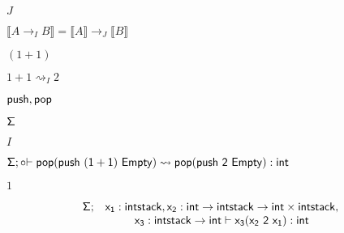 \documentclass[10pt]{book}
\begin{document}
\begin{mdSnippets}
\begin{mdInlineSnippet}%
$J$\end{mdInlineSnippet}%
\begin{mdInlineSnippet}[3770b5b04be251b0fdf3f4fc0a74d5fe]%
$\llbracket A\rightarrow_I B\rrbracket =\llbracket A \rrbracket \rightarrow_J \llbracket B \rrbracket $\end{mdInlineSnippet}%
\begin{mdInlineSnippet}[084d81b8c5dc70186c48137b0f155453]%
$(1+1)$\end{mdInlineSnippet}%
\begin{mdInlineSnippet}[4fd47922d2b9f5b8fc0bc97eeb6394fb]%
$1+1\rightsquigarrow_{I} 2$\end{mdInlineSnippet}%
\begin{mdInlineSnippet}%
${\sf push, pop}$\end{mdInlineSnippet}%
\begin{mdInlineSnippet}%
${\sf \Sigma}$\end{mdInlineSnippet}%
\begin{mdInlineSnippet}[dd7536794b63bf90eccfd37f9b147d7f]%
$I$\end{mdInlineSnippet}%
\begin{mdInlineSnippet}[7b6f56cb9f8ad56e908b92d5cc3a7c1f]%
${\sf \Sigma}; {\sf \circ {\vdash pop (push \ (1+1) \ Empty)\rightsquigarrow pop (push \ 2 \ Empty) :int}}$\end{mdInlineSnippet}%
\begin{mdInlineSnippet}[c4ca4238a0b923820dcc509a6f75849b]%
$1$\end{mdInlineSnippet}%
\begin{mdDisplaySnippet}[211622c84a0cb355ffcb872b4ec84b2d]%
\[%
\begin{array}{c c}
{\sf \Sigma;}&  {\sf x_1:intstack,  x_2:int\rightarrow intstack\rightarrow int\times intstack,}\\
&  {\sf x_3:intstack\rightarrow int \vdash   x_3 (x_2 \ 2\  x_1):int} 
\end{array}
\]%
\end{mdDisplaySnippet}%
\begin{mdDisplaySnippet}%

\end{mdDisplaySnippet}
\end{mdSnippets}
\end{document}
